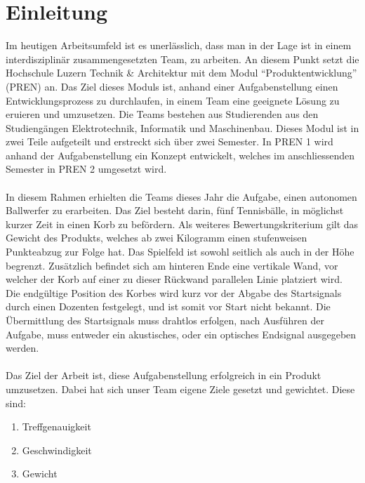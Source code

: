 \section{Einleitung}
Im heutigen Arbeitsumfeld ist es unerlässlich, dass man in der Lage ist in 
einem interdisziplinär zusammengesetzten Team, zu arbeiten. An diesem Punkt 
setzt die Hochschule Luzern Technik \& Architektur mit dem Modul 
\enquote{Produktentwicklung} (PREN) an. Das Ziel dieses Moduls ist, anhand 
einer Aufgabenstellung einen Entwicklungsprozess zu durchlaufen, in einem 
Team eine geeignete Lösung zu eruieren und umzusetzen. Die Teams bestehen 
aus Studierenden aus den Studiengängen Elektrotechnik, Informatik und 
Maschinenbau. Dieses Modul ist in zwei Teile aufgeteilt und erstreckt sich 
über zwei Semester. In PREN 1 wird anhand der Aufgabenstellung ein Konzept 
entwickelt, welches im anschliessenden Semester in PREN 2 umgesetzt wird.\\
\\
In diesem Rahmen erhielten die Teams dieses Jahr die Aufgabe, einen autonomen 
Ballwerfer zu erarbeiten. Das Ziel besteht darin, fünf Tennisbälle, in möglichst 
kurzer Zeit in einen Korb zu befördern. Als weiteres Bewertungskriterium gilt 
das Gewicht des Produkts, welches ab zwei Kilogramm einen stufenweisen 
Punkteabzug zur Folge hat. Das Spielfeld ist sowohl seitlich als auch in der 
Höhe begrenzt. Zusätzlich befindet sich am hinteren Ende eine vertikale Wand, 
vor welcher der Korb auf einer zu dieser Rückwand parallelen Linie platziert 
wird. Die endgültige Position des Korbes wird kurz vor der Abgabe des Startsignals 
durch einen Dozenten festgelegt, und ist somit vor Start nicht bekannt. Die 
Übermittlung des Startsignals muss drahtlos erfolgen, nach Ausführen der Aufgabe, 
muss entweder ein akustisches, oder ein optisches Endsignal ausgegeben werden.\\
\\
Das Ziel der Arbeit ist, diese Aufgabenstellung erfolgreich in ein Produkt 
umzusetzen. Dabei hat sich unser Team eigene Ziele gesetzt und gewichtet. 
Diese sind:
\begin{enumerate}
    \item Treffgenauigkeit
    \item Geschwindigkeit
    \item Gewicht
\end{enumerate}
